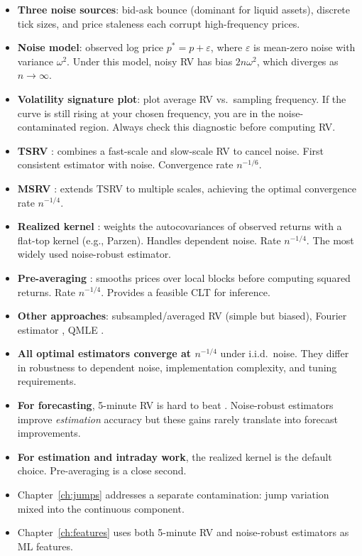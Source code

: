 \begin{itemize}[nosep]
  \item \textbf{Three noise sources}: bid-ask bounce (dominant for liquid assets), discrete tick sizes, and price staleness each corrupt high-frequency prices.

  \item \textbf{Noise model}: observed log price $p^* = p + \varepsilon$, where $\varepsilon$ is mean-zero noise with variance $\omega^2$. Under this model, noisy RV has bias $2n\omega^2$, which diverges as $n \to \infty$.

  \item \textbf{Volatility signature plot}: plot average RV vs.\ sampling frequency. If the curve is still rising at your chosen frequency, you are in the noise-contaminated region. Always check this diagnostic before computing RV.

  \item \textbf{TSRV} \citep{ZhangMyklandAitSahalia2005}: combines a fast-scale and slow-scale RV to cancel noise. First consistent estimator with noise. Convergence rate $n^{-1/6}$.

  \item \textbf{MSRV} \citep{Zhang2006}: extends TSRV to multiple scales, achieving the optimal convergence rate $n^{-1/4}$.

  \item \textbf{Realized kernel} \citep{BNHLS2008}: weights the autocovariances of observed returns with a flat-top kernel (e.g., Parzen). Handles dependent noise. Rate $n^{-1/4}$. The most widely used noise-robust estimator.

  \item \textbf{Pre-averaging} \citep{JacodLiMyklandPodolskijVetter2009}: smooths prices over local blocks before computing squared returns. Rate $n^{-1/4}$. Provides a feasible CLT for inference.

  \item \textbf{Other approaches}: subsampled/averaged RV (simple but biased), Fourier estimator \citep{MalliavinMancino2002}, QMLE \citep{Xiu2010}.

  \item \textbf{All optimal estimators converge at $n^{-1/4}$} under i.i.d.\ noise. They differ in robustness to dependent noise, implementation complexity, and tuning requirements.

  \item \textbf{For forecasting}, 5-minute RV is hard to beat \citep{LPS2015}. Noise-robust estimators improve \emph{estimation} accuracy but these gains rarely translate into forecast improvements.

  \item \textbf{For estimation and intraday work}, the realized kernel is the default choice. Pre-averaging is a close second.

  \item Chapter~\ref{ch:jumps} addresses a separate contamination: jump variation mixed into the continuous component.

  \item Chapter~\ref{ch:features} uses both 5-minute RV and noise-robust estimators as ML features.
\end{itemize}

